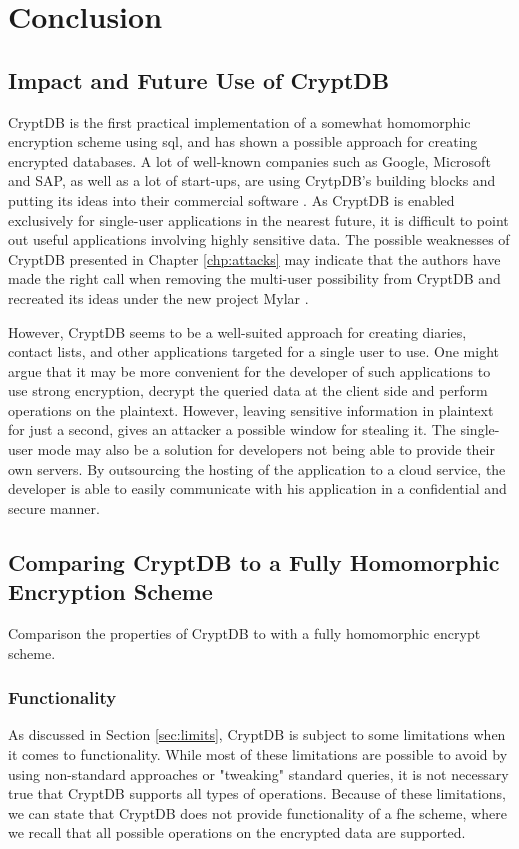 \chapter{Conclusion}
\label{chp:conclusion}

\section{Impact and Future Use of CryptDB}

CryptDB is the first practical implementation of a somewhat homomorphic encryption scheme using \gls{sql}, and has shown a possible approach for creating encrypted databases. A lot of well-known companies such as Google, Microsoft and SAP, as well as a lot of start-ups, are using CrytpDB's building blocks and putting its ideas into their commercial software \cite{cryptdb_homepage}. As CryptDB is enabled exclusively for single-user applications in the nearest future, it is difficult to point out useful applications involving highly sensitive data. The possible weaknesses of CryptDB presented in Chapter \ref{chp:attacks} may indicate that the authors have made the right call when removing the multi-user possibility from CryptDB and recreated its ideas under the new project Mylar \cite{mylar_homepage}.  

However, CryptDB seems to be a well-suited approach for creating diaries, contact lists, and other applications targeted for a single user to use. One might argue that it may be more convenient for the developer of such applications to use strong encryption, decrypt the queried data at the client side and perform operations on the plaintext. However, leaving sensitive information in plaintext for just a second, gives an attacker a possible window for stealing it. The single-user mode may also be a solution for developers not being able to provide their own servers. By outsourcing the hosting of the application to a cloud service, the developer is able to easily communicate with his application in a confidential and secure manner.

\section{Comparing CryptDB to a Fully Homomorphic Encryption Scheme}

Comparison the properties of CryptDB to with a fully homomorphic encrypt scheme.

\subsection{Functionality}
As discussed in Section \ref{sec:limits}, CryptDB is subject to some limitations when it comes to functionality. While most of these limitations are possible to avoid by using non-standard approaches or "tweaking" standard queries, it is not necessary true that CryptDB supports all types of operations. Because of these limitations, we can state that CryptDB does not provide functionality of a \gls{fhe} scheme, where we recall that all possible operations on the encrypted data are supported.

